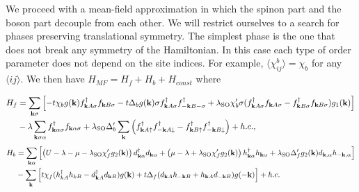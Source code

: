 \documentclass[aps,prb,twocolumn,superscriptaddress,showpacs]{revtex4-1}
\begin{document}
We proceed with a mean-field approximation in which the spinon part and the boson part decouple from each other. We will restrict ourselves to a search for phases preserving translational symmetry. The simplest phase is the one that does not break any symmetry of the Hamiltonian.  In this case each type of order parameter  does not depend on the site indices.   For example,
 $\langle\chi^{b}_{ij}\rangle= \chi_{b}$
for any $\langle ij \rangle$.
We then have $ H_{MF}=H_f+H_b+H_{const} $
where
\begin{widetext}
\begin{align}
\label{Hf}
H_f &= \sum_{\textbf{k}\sigma} \left[ -t\chi_{b}g(\textbf{k})f^{\dag}_{\textbf{k}A\sigma}f_{\textbf{k}B\sigma}
 -t\Delta_b g(\textbf{k})\sigma f^{\dag}_{\textbf{k}A\sigma}f^{\dag}_{-\textbf{k}B-\sigma}
 + \lambda_{\rm{SO}}\chi_b^{\prime} \sigma (f^{\dag}_{\textbf{k}A\sigma}f_{\textbf{k}A\sigma}
 -f^{\dag}_{\textbf{k}B\sigma}f_{\textbf{k}B\sigma})g_1(\textbf{k}) \right ]\nonumber \\
 &-\lambda \sum_{\textbf{k}\sigma\alpha}f^{\dag}_{\textbf{k}\alpha\sigma}f_{\textbf{k}\alpha\sigma} +\lambda_{\rm{SO}}\Delta_b^{\prime}\sum_{\textbf{k}}\left(f^{\dag}_{\textbf{k}A\uparrow}f^{\dag}_{-\textbf{k}A\downarrow}
 -f^{\dag}_{\textbf{k}B\uparrow}f^{\dag}_{-\textbf{k}B\downarrow} \right) + h.c.,
\end{align}
\begin{align}
\label{Hb}
H_b &= \sum_{\textbf{k}\alpha} \left [ \left( U-\lambda-\mu-\lambda_{\rm{SO}}\chi_f^{\prime}g_2(\textbf{k}) \right ) d^{\dag}_{\textbf{k}\alpha}d_{\textbf{k}\alpha}+\left(\mu- \lambda+ \lambda_{\rm{SO}}\chi_f^{\prime}g_2(\textbf{k})\right ) h^{\dag}_{\textbf{k}\alpha}h_{\textbf{k}\alpha} +
\lambda_{\rm{SO}}\Delta_f^{\prime}g_2(\textbf{k})d_{\textbf{k},\alpha}h_{-\textbf{k},\alpha}
\right ]\nonumber \\
&-\sum_{\textbf{k}} \left [ t\chi_{f}(h^{\dag}_{kA}h_{kB}
-d^{\dag}_{\textbf{k}A}d_{\textbf{k}B})g(\textbf{k})+t\Delta_{f}(d_{\textbf{k}A}h_{-\textbf{k}B}+h_{\textbf{k}A}d_{-\textbf{k}B})g(-\textbf{k})\right ] +h.c.
\end{align}
\end{widetext}
\end{document}

